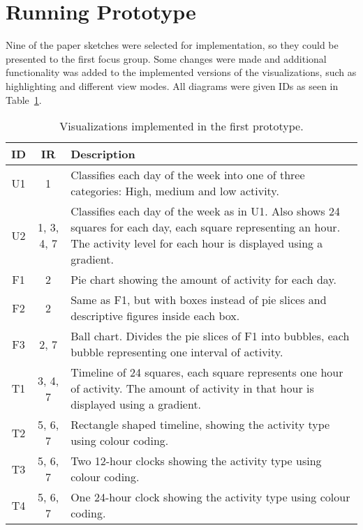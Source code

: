 \section{Running Prototype}
\label{sec:runningPrototype1}
Nine of the paper sketches were selected for implementation, so they could be presented to the first focus group. Some changes were made and additional functionality was added to the implemented versions of the visualizations, such as highlighting and different view modes. All diagrams were given IDs as seen in Table~\ref{tab:runProtDesc1}.

\begin{table}[h!]
  \begin{center}
  \begin{tabular}{|c|c|p{10cm}|}
    \hline
    \textbf{ID} & \textbf{IR} & \textbf{Description}\\ \hline
    U1 & 1 & Classifies each day of the week into one of three categories: High, medium and low activity. \\ \hline
    U2 & 1, 3, 4, 7 & Classifies each day of the week as in U1. Also shows 24 squares for each day, each square representing an hour. The activity level for each hour is displayed using a gradient. \\ \hline
    F1 & 2 & Pie chart showing the amount of activity for each day. \\ \hline
    F2 & 2 & Same as F1, but with boxes instead of pie slices and descriptive figures inside each box.  \\ \hline
    F3 & 2, 7 & Ball chart. Divides the pie slices of F1 into bubbles, each bubble representing one interval of activity. \\ \hline
    T1 & 3, 4, 7 & Timeline of 24 squares, each square represents one hour of activity. The amount of activity in that hour is displayed using a gradient. \\ \hline
    T2 & 5, 6, 7 & Rectangle shaped timeline, showing the activity type using colour coding.  \\ \hline
    T3 & 5, 6, 7 & Two 12-hour clocks showing the activity type using colour coding. \\ \hline
    T4 & 5, 6, 7 & One 24-hour clock showing the activity type using colour coding. \\ \hline
  \end{tabular}
  \end{center}
  \caption[Visualizations in the first prototype]{Visualizations implemented in the first prototype.}
  \label{tab:runProtDesc1}
\end{table}

